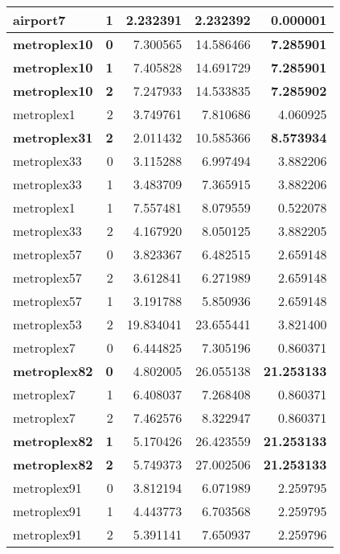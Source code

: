 \documentclass[../../../thesis.tex]{subfiles}
\begin{document}
\begin{longtable}{|l|r|r|r|r|}
\endfoot
\endlastfoot
airport7 & 1 & 2.232391 & 2.232392 & 0.000001 \\\hline
\textbf{metroplex10} & \textbf{0} & 7.300565 & 14.586466 & \textbf{7.285901} \\\hline
\textbf{metroplex10} & \textbf{1} & 7.405828 & 14.691729 & \textbf{7.285901} \\\hline
\textbf{metroplex10} & \textbf{2} & 7.247933 & 14.533835 & \textbf{7.285902} \\\hline
metroplex1 & 2 & 3.749761 & 7.810686 & 4.060925 \\\hline
\textbf{metroplex31} & \textbf{2} & 2.011432 & 10.585366 & \textbf{8.573934} \\\hline
metroplex33 & 0 & 3.115288 & 6.997494 & 3.882206 \\\hline
metroplex33 & 1 & 3.483709 & 7.365915 & 3.882206 \\\hline
metroplex1 & 1 & 7.557481 & 8.079559 & 0.522078 \\\hline
metroplex33 & 2 & 4.167920 & 8.050125 & 3.882205 \\\hline
metroplex57 & 0 & 3.823367 & 6.482515 & 2.659148 \\\hline
metroplex57 & 2 & 3.612841 & 6.271989 & 2.659148 \\\hline
metroplex57 & 1 & 3.191788 & 5.850936 & 2.659148 \\\hline
metroplex53 & 2 & 19.834041 & 23.655441 & 3.821400 \\\hline
metroplex7 & 0 & 6.444825 & 7.305196 & 0.860371 \\\hline
\textbf{metroplex82} & \textbf{0} & 4.802005 & 26.055138 & \textbf{21.253133} \\\hline
metroplex7 & 1 & 6.408037 & 7.268408 & 0.860371 \\\hline
metroplex7 & 2 & 7.462576 & 8.322947 & 0.860371 \\\hline
\textbf{metroplex82} & \textbf{1} & 5.170426 & 26.423559 & \textbf{21.253133} \\\hline
\textbf{metroplex82} & \textbf{2} & 5.749373 & 27.002506 & \textbf{21.253133} \\\hline
metroplex91 & 0 & 3.812194 & 6.071989 & 2.259795 \\\hline
metroplex91 & 1 & 4.443773 & 6.703568 & 2.259795 \\\hline
metroplex91 & 2 & 5.391141 & 7.650937 & 2.259796 \\\hline
\end{longtable}
\end{document}
